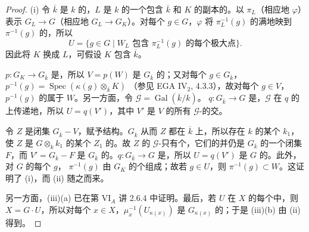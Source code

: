\begin{proof}
(i) 令 $\overline k$ 是 $k$ 的，$L$ 是 $k$ 的一个包含 $\overline k$ 和 $K$ 的副本的。以 $\pi_L$（相应地 $\varphi$）表示 $G_L\to G$（相应地 $G_L\to G_K$）。对每个 $g\in G$，$\varphi$ 将 $\pi_L^{-1}(g)$ 的满地映到 $\pi^{-1}(g)$ 的，所以
\[
U=\{g\in G\mid W_L\text{ 包含 }\pi_L^{-1}(g)\text{ 的每个极大点}\}.
\]
因此将 $K$ 换成 $L$，可假设 $K$ 包含 $\overline k$。

 $p:G_K\to G_{\overline k}$ 是，所以 $V=p(W)$ 是 $G_{\overline k}$ 的；又对每个 $g\in G_{\overline k}$，$p^{-1}(g)=\operatorname{Spec}(\kappa(g)\otimes_{\overline k}K)$ （参见 EGA IV$_2$, 4.3.3），故对每个 $g\in V$，$p^{-1}(g)$ 的属于 $W$。另一方面，令 $\mathscr G=\operatorname{Gal}(\overline k/k)$。 $q:G_{\overline k}\to G$ 是，$\mathscr G$ 在 $q$ 的上传递地，所以 $U=q(V')$，其中 $V'$ 是 $V$ 的所有 $\mathscr G$-的交。

令 $Z$ 是闭集 $G_{\overline k}-V$，赋予结构。$G_{\overline k}$ 从而 $Z$ 都在 $\overline k$ 上，所以存在 $k$ 的某个 $k_1$，使 $Z$ 是 $G\otimes_kk_1$ 的某个 $Z_1$ 的。故 $Z$ 的 $\mathscr G$-只有个，它们的并仍是 $G_{\overline k}$ 的一个闭集 $F$，而 $V'=G_{\overline k}-F$ 是 $G_{\overline k}$ 的。$q:G_{\overline k}\to G$ 是，所以 $U=q(V')$ 是 $G$ 的。此外，对 $G$ 的每个 $g$， $\pi^{-1}(g)$ 由 $G_K$ 的个组成；故若 $g\in U$，则 $\pi^{-1}(g)\subset W$。这证明了 (i)，而 (ii) 随之而来。

另一方面，(iii)(a) 已在第 VI$_A$ 讲 2.6.4 中证明。最后，若 $U$ 在 $X$ 的每个中，则 $X=G\cdot U$，所以对每个 $x\in X$，$\mu_x^{-1}(U_{\kappa(x)})$ 是 $G_{\kappa(x)}$ 的；于是 (iii)(b) 由 (ii) 得到。
\end{proof}
